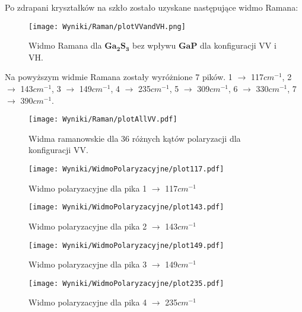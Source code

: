 Po zdrapani kryształków na szkło zostało uzyskane następujące widmo Ramana:

\begin{figure}[H]
	\begin{center}
		\texttt{[image: Wyniki/Raman/plotVVandVH.png]}
		\caption{Widmo Ramana dla $\mathbf{Ga_{2}S_{3}}$ bez wpływu $\mathbf{GaP}$ dla konfiguracji VV i VH.}
	\end{center}
\end{figure}

Na powyższym widmie Ramana zostały wyróżnione 7 pików. 1 $\rightarrow$ 117$cm^{-1}$, 2 $\rightarrow$ 143$cm^{-1}$, 3 $\rightarrow$ 149$cm^{-1}$, 4 $\rightarrow$ 235$cm^{-1}$, 5 $\rightarrow$ 309$cm^{-1}$, 6 $\rightarrow$ 330$cm^{-1}$, 7 $\rightarrow$ 390$cm^{-1}$. 

\begin{figure}[H]
	\begin{center}
		\texttt{[image: Wyniki/Raman/plotAllVV.pdf]}
		\caption{Widma ramanowskie dla 36 różnych kątów polaryzacji dla konfiguracji VV.}
	\end{center}
\end{figure}

\begin{figure}[H]
	\begin{center}
		\texttt{[image: Wyniki/WidmoPolaryzacyjne/plot117.pdf]}
		\caption{Widmo polaryzacyjne dla pika 1 $\rightarrow$ 117$cm^{-1}$ }
	\end{center}
\end{figure}

\begin{figure}[H]
	\begin{center}
		\texttt{[image: Wyniki/WidmoPolaryzacyjne/plot143.pdf]}
		\caption{Widmo polaryzacyjne dla pika 2 $\rightarrow$ 143$cm^{-1}$ }
	\end{center}
\end{figure}

\begin{figure}[H]
	\begin{center}
		\texttt{[image: Wyniki/WidmoPolaryzacyjne/plot149.pdf]}
		\caption{Widmo polaryzacyjne dla pika 3 $\rightarrow$ 149$cm^{-1}$ }
	\end{center}
\end{figure}

\begin{figure}[H]
	\begin{center}
		\texttt{[image: Wyniki/WidmoPolaryzacyjne/plot235.pdf]}
		\caption{Widmo polaryzacyjne dla pika 4 $\rightarrow$ 235$cm^{-1}$ }
	\end{center}
\end{figure}

